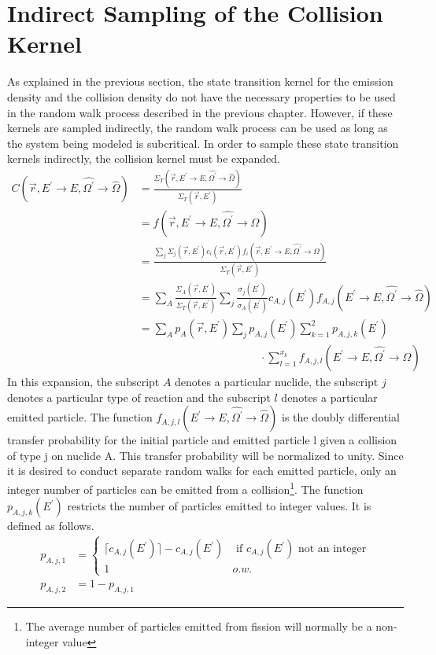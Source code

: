 \section{Indirect Sampling of the Collision Kernel}
As explained in the previous section, the state transition kernel for the 
emission density and the collision density do not have the necessary properties
to be used in the random walk process described in the previous chapter. 
However, if these kernels are sampled indirectly, the random walk process can
be used as long as the system being modeled is subcritical. In order to sample
these state transition kernels indirectly, the collision kernel must be 
expanded. 
\begin{align}
  C(\vec{r},E^{'} \to E, \hat{\Omega^{'}} \to \hat{\Omega}) & =
  \frac{\Sigma_T(\vec{r},E^{'} \to E,\hat{\Omega^{'}} \to \hat{\Omega})}
       {\Sigma_T(\vec{r},E^{'})} \nonumber \\
  & = f(\vec{r},E^{'} \to E,\hat{\Omega^{'}} \to \hat{\Omega}) \nonumber \\
  & = \frac{\sum_j \Sigma_j(\vec{r},E^{'})c_i(\vec{r},E^{'})
            f_i(\vec{r},E^{'} \to E,\hat{\Omega^{'}} \to \hat{\Omega})}
           {\Sigma_T(\vec{r},E^{'})} \nonumber \\
  & = \sum_A \frac{\Sigma_A(\vec{r},E^{'})}{\Sigma_T(\vec{r},E^{'})}
      \sum_j \frac{\sigma_j(E^{'})}{\sigma_A(E^{'})} c_{A,j}(E^{'})
      f_{A,j}(E^{'} \to E,\hat{\Omega^{'}} \to \hat{\Omega}) \nonumber \\
  & = \sum_A p_A(\vec{r},E^{'}) \sum_j p_{A,j}(E^{'}) 
      \sum_{k=1}^2 p_{A,j,k}(E^{'}) \nonumber \\
  & \qquad \qquad \qquad \qquad \qquad \quad
      \cdot \sum_{l=1}^{x_k} 
      f_{A,j,l}(E^{'} \to E,\hat{\Omega^{'}} \to \hat{\Omega})
  \label{eq:fully_expanded_collision_kernel}
\end{align}
In this expansion, the subscript $A$ denotes a particular nuclide, the subscript
$j$ denotes a particular type of reaction and the subscript $l$ denotes a 
particular emitted particle. The function 
$f_{A,j,l}(E^{'} \to E,\hat{\Omega^{'}} \to \hat{\Omega})$ is the doubly
differential transfer probability for the initial particle and emitted
particle l given a collision of type j on nuclide A. This transfer probability
will be normalized to unity. Since it is desired to conduct separate random
walks for each emitted particle, only an integer number of particles 
can be emitted from a collision\footnote{The average number of particles emitted
from fission will normally be a non-integer value}. The function 
$p_{A,j,k}(E^{'})$ restricts the number of particles emitted to integer values.
It is defined as follows.
\begin{align}
  p_{A,j,1} & =
  \begin{cases}
    \lceil c_{A,j}(E^{'}) \rceil - c_{A,j}(E^{'}) & \text{ if } c_{A,j}(E^{'})
    \text{ not an integer} \\
    1 & o.w.
  \end{cases} \\
  p_{A,j,2} & = 1 - p_{A,j,1}
\end{align}

